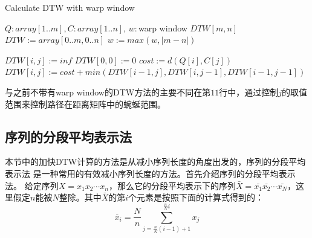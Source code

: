 \begin{algorithm}[h]
\caption{Calculate DTW with warp window}
\begin{algorithmic}[1]
\small
\REQUIRE $Q:array[1..m], C:array[1..n]$, $w:$warp window
\ENSURE $DTW[m,n]$
\STATE $DTW := array[0..m,0..n]$
\STATE $w := max(w,\left| {m-n} \right|)$

\STATE $DTW[i,j] := inf$
\ENDFOR
\ENDFOR
\STATE $DTW[0,0] := 0$
\STATE
{}
\STATE $cost := d(Q[i],C[j])$
\STATE $DTW[i,j]:=cost+min(DTW[i-1,j],DTW[i,j-1],DTW[i-1,j-1])$
\ENDFOR
\ENDFOR
\end{algorithmic}
\end{algorithm}

与之前不带有warp window的DTW方法的主要不同在第$11$行中，通过控制$j$的取值范围来控制路径在距离矩阵中的蜿蜒范围。

\subsection{序列的分段平均表示法}
本节中的加快DTW计算的方法是从减小序列长度的角度出发的，序列的分段平均表示法\cite{Keogh2000} 是一种常用的有效减小序列长度的方法。首先介绍序列的分段平均表示法。
给定序列$X = x_1 x_2 \cdots x_n$，那么它的分段平均表示下的序列$\bar{X} = \bar{x_1} \bar{x_2} \cdots \bar{x_N}$，这里假定$n$能被$N$整除。其中$\bar{X}$的第$i$个元素是按照下面的计算式得到的：
\begin{equation}\label{equ:8}
  {\overline x _i} = \frac{N}{n}\sum\limits_{j = \frac{n}{N}\left( {i - 1} \right) + 1}^{\frac{n}{N}i} {{x_j}}
\end{equation}

